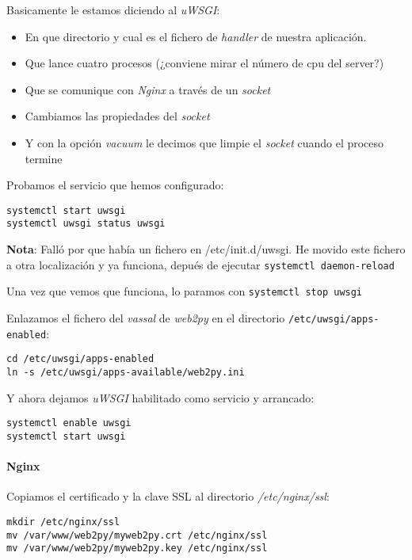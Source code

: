 \documentclass[12pt,spanish,]{article}
\providecommand{\tightlist}{%
  \setlength{\itemsep}{0pt}\setlength{\parskip}{0pt}}
\let\oldparagraph\paragraph
\renewcommand{\paragraph}[1]{\oldparagraph{#1}\mbox{}}
\begin{document}
Basicamente le estamos diciendo al \emph{uWSGI}:

\begin{itemize}
\tightlist
\item
  En que directorio y cual es el fichero de \emph{handler} de nuestra
  aplicación.
\item
  Que lance cuatro procesos (¿conviene mirar el número de cpu del
  server?)
\item
  Que se comunique con \emph{Nginx} a través de un \emph{socket}
\item
  Cambiamos las propiedades del \emph{socket}
\item
  Y con la opción \emph{vacuum} le decimos que limpie el \emph{socket}
  cuando el proceso termine
\end{itemize}

Probamos el servicio que hemos configurado:

\begin{verbatim}
systemctl start uwsgi
systemctl uwsgi status uwsgi
\end{verbatim}

\textbf{Nota}: Falló por que había un fichero en /etc/init.d/uwsgi. He
movido este fichero a otra localización y ya funciona, depués de
ejecutar \texttt{systemctl\ daemon-reload}

Una vez que vemos que funciona, lo paramos con
\texttt{systemctl\ stop\ uwsgi}

Enlazamos el fichero del \emph{vassal} de \emph{web2py} en el directorio
\texttt{/etc/uwsgi/apps-enabled}:

\begin{verbatim}
cd /etc/uwsgi/apps-enabled
ln -s /etc/uwsgi/apps-available/web2py.ini
\end{verbatim}

Y ahora dejamos \emph{uWSGI} habilitado como servicio y arrancado:

\begin{verbatim}
systemctl enable uwsgi
systemctl start uwsgi
\end{verbatim}

\hypertarget{nginx}{%
\paragraph{Nginx}\label{nginx}}

Copiamos el certificado y la clave SSL al directorio
\emph{/etc/nginx/ssl}:

\begin{verbatim}
mkdir /etc/nginx/ssl
mv /var/www/web2py/myweb2py.crt /etc/nginx/ssl
mv /var/www/web2py/myweb2py.key /etc/nginx/ssl
\end{verbatim}
\end{document}
